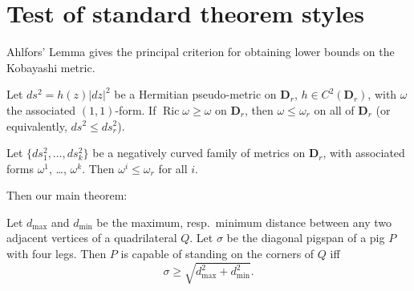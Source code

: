 \theoremstyle{break}
\newtheorem{bthm}{B-Theorem}

\theoremstyle{exercise}
\newtheorem{exer}{Exercise}

\swapnumbers
\theoremstyle{plain}
\newtheorem{thmsw}{Theorem}[section]
\newtheorem{corsw}[thmsw]{Corollary}
\newtheorem{propsw}{Proposition}
\newtheorem{lemsw}[thmsw]{Lemma}

\let\lvert=|\let\rvert=|
\newcommand{\Ric}{\mathop{\mathrm{Ric}}\nolimits}

\addtolength{\textwidth}{8pt}


\maketitle

\section{Test of standard theorem styles}

Ahlfors' Lemma gives the principal criterion for obtaining lower bounds
on the Kobayashi metric.

\begin{Ahlfors}
Let $ds^2 = h(z)\lvert dz\rvert^2$ be a Hermitian pseudo-metric on
$\mathbf{D}_r$, $h\in C^2(\mathbf{D}_r)$, with $\omega$ the associated
$(1,1)$-form. If $\Ric\omega\geq\omega$ on $\mathbf{D}_r$,
then $\omega\leq\omega_r$ on all of $\mathbf{D}_r$ (or equivalently,
$ds^2\leq ds_r^2$).
\end{Ahlfors}

\begin{lem}
Let $\{ds_1^2,\dots,ds_k^2\}$ be a negatively curved family of metrics
on $\mathbf{D}_r$, with associated forms $\omega^1$, \dots, $\omega^k$.
Then $\omega^i \leq\omega_r$ for all $i$.
\end{lem}

Then our main theorem:
\begin{thm}\label{pigspan}
Let $d_{\max}$ and $d_{\min}$ be the maximum, resp.\ minimum distance
between any two adjacent vertices of a quadrilateral $Q$. Let $\sigma$
be the diagonal pigspan of a pig $P$ with four legs.
Then $P$ is capable of standing on the corners of $Q$ iff
\begin{equation}\label{sdq}
\sigma\geq \sqrt{d_{\max}^2+d_{\min}^2}.
\end{equation}
\end{thm}

